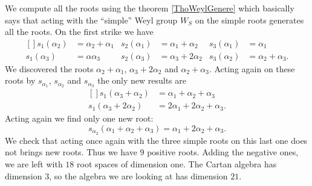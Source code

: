 We compute all the roots using the theorem \ref{ThoWeylGenere} which basically says that acting with the ``simple'' Weyl group \( W_S\) on the simple roots generates all the roots. On the first strike we have
\begin{equation}
    \begin{aligned}[]
        s_1(\alpha_2)&=\alpha_2+\alpha_1&s_2(\alpha_1)&=\alpha_1+\alpha_2&s_3(\alpha_1)&=\alpha_1\\
        s_1(\alpha_3)&=\alpha\alpha_3 &s_2(\alpha_3)&=\alpha_3+2\alpha_2&s_3(\alpha_2)&=\alpha_2+\alpha_3.
    \end{aligned}
\end{equation}
We discovered the roots \( \alpha_2+\alpha_1\), \( \alpha_3+2\alpha_2\) and \( \alpha_2+\alpha_3\). Acting again on these roots by \( s_{\alpha_1}\), \( s_{\alpha_2}\) and \( s_{\alpha_3}\) the only new results are
\begin{equation}
    \begin{aligned}[]
        s_1(\alpha_3+\alpha_2)&=\alpha_1+\alpha_2+\alpha_3\\
        s_1(\alpha_3+2\alpha_2)&=2\alpha_1+2\alpha_2+\alpha_3.
    \end{aligned}
\end{equation}
Acting again we find only one new root: 
\begin{equation}
    s_{\alpha_2}(\alpha_1+\alpha_2+\alpha_3)=\alpha_1+2\alpha_2+\alpha_3. 
\end{equation}
We check that acting once again with the three simple roots on this last one does not brings new roots. Thus we have \( 9\) positive roots. Adding the negative ones, we are left with \( 18\) root spaces of dimension one. The Cartan algebra has dimension \( 3\), so the algebra we are looking at has dimension \( 21\).

